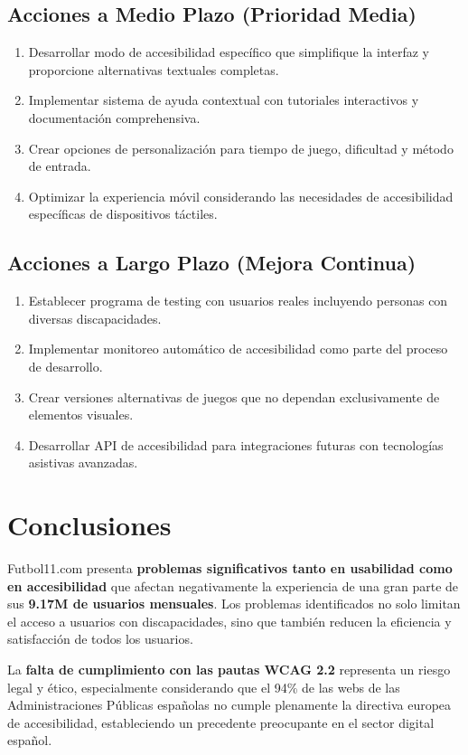 \documentclass{article}
\begin{document}
	\subsection{Acciones a Medio Plazo (Prioridad Media)}
	\noindent
	\begin{enumerate}
		\item Desarrollar modo de accesibilidad específico que simplifique la interfaz y proporcione alternativas textuales completas.
		\item Implementar sistema de ayuda contextual con tutoriales interactivos y documentación comprehensiva.
		\item Crear opciones de personalización para tiempo de juego, dificultad y método de entrada.
		\item Optimizar la experiencia móvil considerando las necesidades de accesibilidad específicas de dispositivos táctiles.
	\end{enumerate}

	\subsection{Acciones a Largo Plazo (Mejora Continua)}
	\noindent
	\begin{enumerate}
		\item Establecer programa de testing con usuarios reales incluyendo personas con diversas discapacidades.
		\item Implementar monitoreo automático de accesibilidad como parte del proceso de desarrollo.
		\item Crear versiones alternativas de juegos que no dependan exclusivamente de elementos visuales.
		\item Desarrollar API de accesibilidad para integraciones futuras con tecnologías asistivas avanzadas.
	\end{enumerate}

	\section{Conclusiones}

	\noindent
	Futbol11.com presenta \textbf{problemas significativos tanto en usabilidad como en accesibilidad} que afectan negativamente la experiencia de una gran parte de sus \textbf{9.17M de usuarios mensuales}. Los problemas identificados no solo limitan el acceso a usuarios con discapacidades, sino que también reducen la eficiencia y satisfacción de todos los usuarios.

	\noindent
	La \textbf{falta de cumplimiento con las pautas WCAG 2.2} representa un riesgo legal y ético, especialmente considerando que el 94\% de las webs de las Administraciones Públicas españolas no cumple plenamente la directiva europea de accesibilidad, estableciendo un precedente preocupante en el sector digital español.
\end{document}
